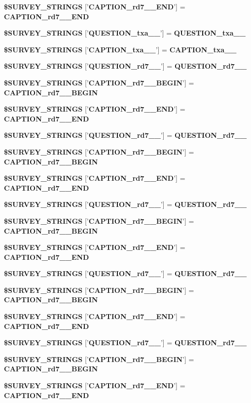 \begin{CompactItemize}
{\bf \$SURVEY\_\-STRINGS} ['{\bf CAPTION\_\-rd7\_\_\-END}'] = {\bf CAPTION\_\-rd7\_\_\-END}
\item 
{\bf \$SURVEY\_\-STRINGS} ['{\bf QUESTION\_\-txa\_\_\-}'] = {\bf QUESTION\_\-txa\_\_\-}
\item 
{\bf \$SURVEY\_\-STRINGS} ['{\bf CAPTION\_\-txa\_\_\-}'] = {\bf CAPTION\_\-txa\_\_\-}
\item 
{\bf \$SURVEY\_\-STRINGS} ['{\bf QUESTION\_\-rd7\_\_\-}'] = {\bf QUESTION\_\-rd7\_\_\-}
\item 
{\bf \$SURVEY\_\-STRINGS} ['{\bf CAPTION\_\-rd7\_\_\-BEGIN}'] = {\bf CAPTION\_\-rd7\_\_\-BEGIN}
\item 
{\bf \$SURVEY\_\-STRINGS} ['{\bf CAPTION\_\-rd7\_\_\-END}'] = {\bf CAPTION\_\-rd7\_\_\-END}
\item 
{\bf \$SURVEY\_\-STRINGS} ['{\bf QUESTION\_\-rd7\_\_\-}'] = {\bf QUESTION\_\-rd7\_\_\-}
\item 
{\bf \$SURVEY\_\-STRINGS} ['{\bf CAPTION\_\-rd7\_\_\-BEGIN}'] = {\bf CAPTION\_\-rd7\_\_\-BEGIN}
\item 
{\bf \$SURVEY\_\-STRINGS} ['{\bf CAPTION\_\-rd7\_\_\-END}'] = {\bf CAPTION\_\-rd7\_\_\-END}
\item 
{\bf \$SURVEY\_\-STRINGS} ['{\bf QUESTION\_\-rd7\_\_\-}'] = {\bf QUESTION\_\-rd7\_\_\-}
\item 
{\bf \$SURVEY\_\-STRINGS} ['{\bf CAPTION\_\-rd7\_\_\-BEGIN}'] = {\bf CAPTION\_\-rd7\_\_\-BEGIN}
\item 
{\bf \$SURVEY\_\-STRINGS} ['{\bf CAPTION\_\-rd7\_\_\-END}'] = {\bf CAPTION\_\-rd7\_\_\-END}
\item 
{\bf \$SURVEY\_\-STRINGS} ['{\bf QUESTION\_\-rd7\_\_\-}'] = {\bf QUESTION\_\-rd7\_\_\-}
\item 
{\bf \$SURVEY\_\-STRINGS} ['{\bf CAPTION\_\-rd7\_\_\-BEGIN}'] = {\bf CAPTION\_\-rd7\_\_\-BEGIN}
\item 
{\bf \$SURVEY\_\-STRINGS} ['{\bf CAPTION\_\-rd7\_\_\-END}'] = {\bf CAPTION\_\-rd7\_\_\-END}
\item 
{\bf \$SURVEY\_\-STRINGS} ['{\bf QUESTION\_\-rd7\_\_\-}'] = {\bf QUESTION\_\-rd7\_\_\-}
\item 
{\bf \$SURVEY\_\-STRINGS} ['{\bf CAPTION\_\-rd7\_\_\-BEGIN}'] = {\bf CAPTION\_\-rd7\_\_\-BEGIN}
\item 
{\bf \$SURVEY\_\-STRINGS} ['{\bf CAPTION\_\-rd7\_\_\-END}'] = {\bf CAPTION\_\-rd7\_\_\-END}
\item 

\end{CompactItemize}
